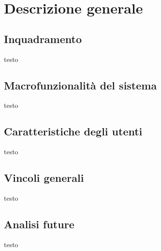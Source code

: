 \chapter{Descrizione generale}

\section{Inquadramento}
testo
\section{Macrofunzionalità del sistema}
testo
\section{Caratteristiche degli utenti}
testo
\section{Vincoli generali}
testo
\section{Analisi future}
testo
